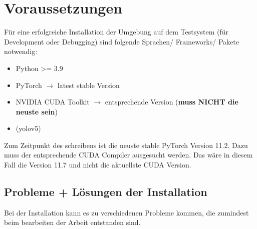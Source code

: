 \chapter{Voraussetzungen}

Für eine erfolgreiche Installation der Umgebung auf dem Testsystem (für Development oder Debugging) sind folgende Sprachen/ Frameworks/ Pakete notwendig:
\begin{itemize}
    \item Python >= 3.9
    \item PyTorch $\rightarrow$ latest stable Version
    \item NVIDIA CUDA Toolkit $\rightarrow$ entsprechende Version (\textbf{muss NICHT die neuste sein})
    \item (yolov5)
\end{itemize}

Zum Zeitpunkt des schreibens ist die neuste stable PyTorch Version 11.2. Dazu muss der entsprechende CUDA Compiler ausgesucht werden. Das wäre in diesem Fall die Version 11.7 und nicht die aktuellste CUDA Version. 

\section{Probleme + Lösungen der Installation}

Bei der Installation kann es zu verschiedenen Probleme kommen, die zumindest beim bearbeiten der Arbeit entstanden sind.